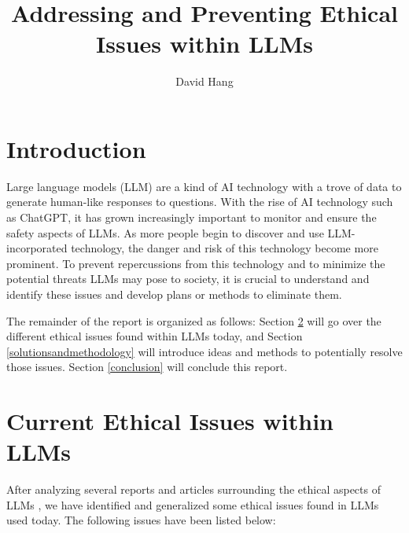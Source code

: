 \documentclass[12pt]{extarticle}
\title{Addressing and Preventing Ethical Issues within LLMs}
\begin{document}
\author{David Hang}
\maketitle

\section{Introduction}
Large language models (LLM) are a kind of AI technology with a trove of data to generate human-like responses to questions. With the rise of AI technology such as ChatGPT, it has grown increasingly important to monitor and ensure the safety aspects of LLMs. As more people begin to discover and use LLM-incorporated technology, the danger and risk of this technology become more prominent. To prevent repercussions from this technology and to minimize the potential threats LLMs may pose to society, it is crucial to understand and identify these issues and develop plans or methods to eliminate them. 

The remainder of the report is organized as follows: Section \ref{currentethicalissues} will go over the different ethical issues found within LLMs today, and Section \ref{solutionsandmethodology} will introduce ideas and methods to potentially resolve those issues. Section \ref{conclusion} will conclude this report.

\section{Current Ethical Issues within LLMs}
\label{currentethicalissues}
After analyzing several reports and articles surrounding the ethical aspects of LLMs \cite{akbar2023ethical}, we have identified and generalized some ethical issues found in LLMs used today. The following issues have been listed below:
\end{document}
